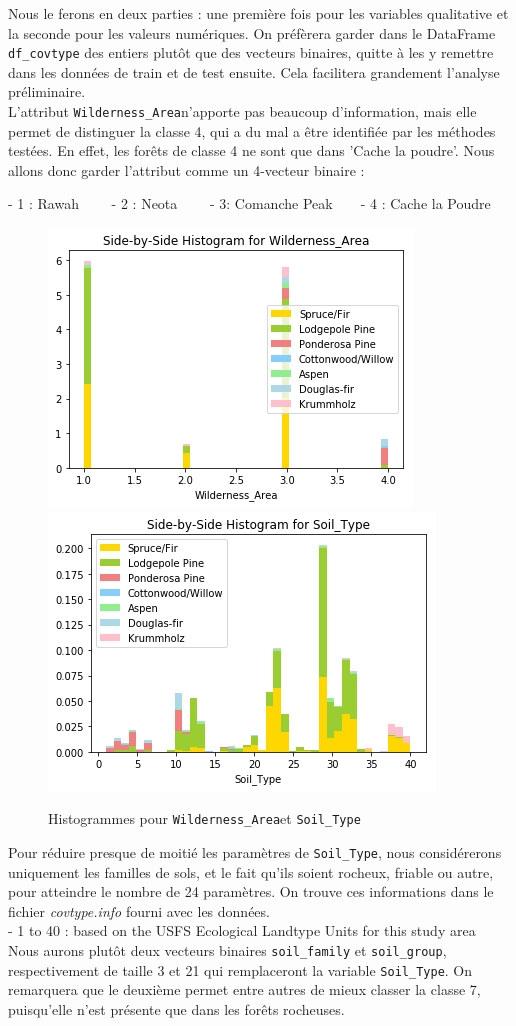 \documentclass[12pt,a4paper]{article}
\numberwithin{equation}{section}
\newcommand{\wilderness}{\texttt{Wilderness\_Area}}
\newcommand{\soil}{\texttt{Soil\_Type}}
\begin{document}
	Nous le ferons en deux parties : une première fois pour les variables qualitative et la seconde pour les valeurs numériques. On préfèrera garder dans le DataFrame \verb!df_covtype! des entiers plutôt que des vecteurs binaires, quitte à les y remettre dans les données de train et de test ensuite. Cela facilitera grandement l'analyse préliminaire.\\

	L'attribut \wilderness n'apporte pas beaucoup d'information, mais elle permet de distinguer la classe 4, qui a du mal a être identifiée par les méthodes testées. En effet, les forêts de classe 4 ne sont que dans 'Cache la poudre'. Nous allons donc garder l'attribut comme un 4-vecteur binaire : 
		
	 - 1 : Rawah \ \ \ \ - 2 : Neota  \ \ \ \ - 3: Comanche Peak\ \ \ \ - 4 : Cache la Poudre  

	\begin{figure}[h]
		\centering
		\hfill
		\includegraphics[width=0.35\linewidth]{img/wilderness_hist}
		 \hfill
		\includegraphics[width=0.35\linewidth]{img/soil_hist}
		\hfill
		\label{fig:wildernesssoilhist}
		\caption{Histogrammes pour \wilderness et \soil}
	\end{figure}

	Pour réduire presque de moitié les paramètres de \soil, nous considérerons uniquement les familles de sols, et le fait qu'ils soient rocheux, friable ou autre, pour atteindre le nombre de 24 paramètres. On trouve ces informations dans le fichier \textit{covtype.info} fourni avec les données.\\
	
	-  1 to 40 : based on the USFS Ecological Landtype Units for this study area\\
	
	Nous aurons plutôt deux vecteurs binaires \texttt{soil\_family} et \texttt{soil\_group}, respectivement de taille 3 et 21 qui remplaceront la variable \soil. On remarquera que le deuxième permet entre autres de mieux classer la classe 7, puisqu'elle n'est présente que dans les forêts rocheuses.
	
\end{document}
